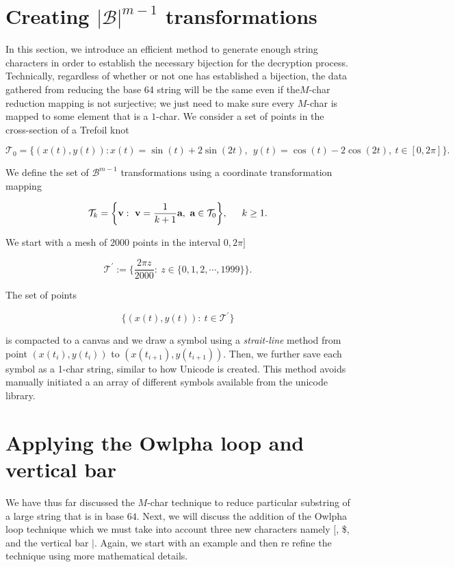 \documentclass[amsmath,12pt,a4paper]{amsart}
\begin{document}
\section{Creating $|\mathcal{B}|^{m-1}$ transformations}
In this section, we introduce an efficient method to generate enough string characters in order to establish the necessary bijection for the decryption process. Technically, regardless of whether or not one has established a bijection, the data gathered from reducing the base 64 string will be the same even if the$ M$-char reduction mapping is not surjective; we just need to make sure every $M$-char is mapped to some element that is a $1$-char. We consider a set of points in the cross-section of a Trefoil knot 

\begin{equation}\label{Eq43}
\mathcal{T}_0 = \biggl\{(x(t),y(t)): x(t) = \sin(t)+2\sin(2t),~~y(t) = \cos(t)-2\cos(2t), ~t\in [0,2\pi]\}.
\end{equation}

We define the set of $\mathcal{B}^{m-1}$ transformations using a coordinate transformation mapping 

\begin{equation}\label{Eq44}
\mathcal{T}_k =\biggl\{\textbf{v}:~ \textbf{v}= \dfrac{1}{k+1}\textbf{a}, ~\textbf{a}\in \mathcal{T}_0 \biggr\}, \indent k\ge 1.
\end{equation}

We start with a mesh of $2000$ points in the interval $0,2\pi]$

\begin{equation}\label{Eq45}
\mathcal{T}^{\prime}:= \{\dfrac{2\pi z}{2000}:~ z\in \{0,1, 2,\cdots, 1999\}\}.
\end{equation}

The set of points 

\begin{equation}\label{Eq46}
\biggl\{(x(t),y(t)):~ t\in \mathcal{T}^\prime\biggr\}
\end{equation}

is compacted to a canvas and we draw a symbol using a \textit{strait-line} method from point $(x(t_i),y(t_i))$ to $(x(t_{i+1}),y(t_{i+1}))$. Then, we further save each symbol as a 1-char string, similar to how Unicode is created. This method avoids manually initiated a an array of different symbols available from the unicode library. 

\section{Applying the Owlpha loop and vertical bar}
We have thus far discussed the $M$-char technique to reduce particular substring of a large string that is in base $64$. Next, we will discuss the addition of the Owlpha loop technique which we must take into account three new characters namely $[$, \$, and the vertical bar $\vert$. Again, we start with an example and then re refine the technique using more mathematical details. 
\end{document}
